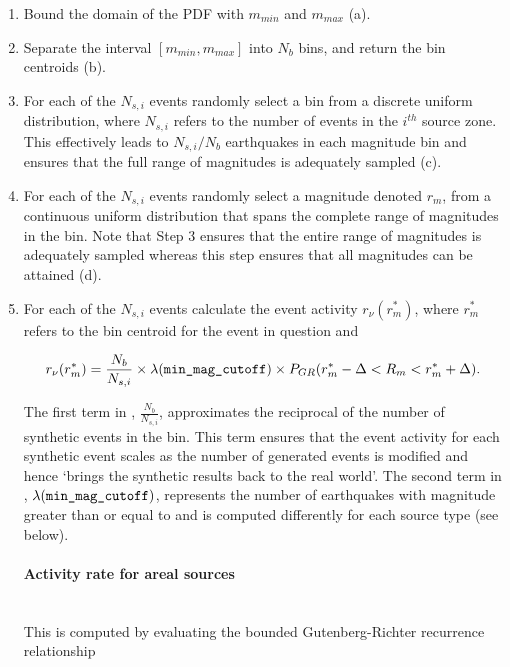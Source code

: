 \begin{enumerate}
\item Bound the domain of the PDF with $m_{min}$ and $m_{max}$
(a).

\item Separate the interval $[m_{min}, m_{max}]$ into $N_b$ bins,
and return the bin centroids (b).

\item For each of the $N_{s,i}$ events randomly select a bin from
a discrete uniform
  distribution, where $N_{s,i}$ refers to the number of events in the $i^{th}$ source zone.
  This effectively leads to $N_{s,i}/N_b$ earthquakes in
  each magnitude bin and ensures that the full range of magnitudes
  is adequately sampled (c).

\item For each of the $N_{s,i}$ events randomly select a magnitude
denoted $r_m$, from a
  continuous uniform distribution that spans the complete range of magnitudes in the
  bin. Note that Step 3 ensures that the entire range of magnitudes is
  adequately sampled whereas this step ensures that all magnitudes can be
  attained (d).

\item For each of the $N_{s,i}$ events calculate the event
activity $r_\nu(r_m^*)$, where $r_m^*$ refers to the bin centroid
for the event in question and

\begin{equation}
\label{eq:event-activity} r_\nu(r_m^*) = \frac{N_b}{N_{s,i}}
\times \lambda(\typepar{min}{\_mag}{\_cutoff}) \times
P_{GR}(r_m^*-\Delta<R_m<r_m^*+\Delta).
\end{equation}

The first term in , $\frac{N_b}{N_{s,i}}$,
approximates the reciprocal of the number of synthetic events in
the bin. This term ensures that the event activity for each
synthetic event scales as the number of generated events is
modified and hence `brings the synthetic results back to the real
world'. The second term in ,
$\lambda(\typepar{min}{\_mag}{\_cutoff})$, represents the number
of earthquakes with magnitude greater than or equal to
 and is computed differently for each source type (see below).

\paragraph{Activity rate for areal sources} 
\label{sec:rv_areal_GR}
\\
This is computed by evaluating the bounded Gutenberg-Richter recurrence relationship


\end{enumerate}
